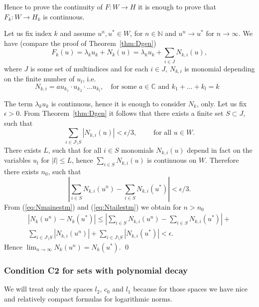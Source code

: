 Hence to prove the continuity of $F:W \to H$ it is enough to prove that $F_k:W \to H_k$ is continuous.

Let us fix index $k$ and assume   $u^n,u^* \in W$, for $n
\in \mathbb{N}$ and $u^n \to u^*$ for $n \to \infty$. We have
(compare the proof of Theorem~\ref{thm:Dgen})
\begin{equation*}
  F_k(u)=\lambda_k u_k + N_k(u)=\lambda_k u_k + \sum_{i \in J} N_{k,i}(u),
\end{equation*}
where $J$ is some set of multindices and for each $i \in J$,
$N_{k,i}$ is monomial depending on the finite number of $u_{l}$,
i.e.
\begin{displaymath}
  N_{k,i}= a u_{k_1}\cdot u_{k_2}  \cdot \dots u_{k_l}, \quad
  \mbox{for some $a \in \mathbb{C}$ and $k_1+\dots+k_l=k$ }
\end{displaymath}

The term $\lambda_k u_k$ is continuous, hence it is enough to
consider $N_k$, only. Let us fix $\epsilon > 0$. From
Theorem~\ref{thm:Dgen} it follows that there exists a finite set $S
\subset J$, such that
\begin{equation}
  \sum_{i \in J \setminus S} |N_{k,i}(u)| < \epsilon/3, \qquad
    \mbox{ for all $u \in W$}. \label{eq:Ntailestm}
\end{equation}
There exists $L$, such that for all $i \in S$ monomials
$N_{k,i}(u)$ depend in fact on the variables $u_{l}$ for $|l| \leq
L$, hence $\sum_{i \in S} N_{k,i}(u)$ is continuous on $W$. Therefore there exists $n_0$, such that
\begin{equation}
  \left| \sum_{i \in S} N_{k,i}(u^n) -  \sum_{i \in S} N_{k,i}(u^*)
  \right|< \epsilon/3.  \label{eq:Nmainestm}
\end{equation}
From (\ref{eq:Nmainestm}) and (\ref{eq:Ntailestm}) we obtain for
$n > n_0$
\begin{eqnarray*}
  |N_k(u^n) - N_k(u^*)| \leq   \left| \sum_{i \in S} N_{k,i}(u^n) -  \sum_{i \in S} N_{k,i}(u^*)
  \right| +  \\ \sum_{i \in J \setminus S} |N_{k,i}(u^n)| +
     \sum_{i \in J \setminus S} |N_{k,i}(u^*)| < \epsilon.
\end{eqnarray*}
Hence $\lim_{n \to \infty} N_k(u^n)=N_k(u^*)$.
 \qed




\subsubsection{Condition C2 for sets with polynomial decay}
\label{sssec:condDpolDec}
We will treat only the spaces $l_2$, $c_0$ and $l_1$ because for those spaces we have nice and relatively compact formulas for logarithmic norms.

